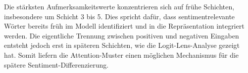Die stärksten Aufmerksamkeitswerte konzentrieren sich auf frühe Schichten, insbesondere um Schicht 3 bis 5. Dies spricht dafür, dass sentimentrelevante Wörter bereits früh im Modell identifiziert und in die Repräsentation integriert werden. Die eigentliche Trennung zwischen positiven und negativen Eingaben entsteht jedoch erst in späteren Schichten, wie die Logit-Lens-Analyse gezeigt hat. Somit liefern die Attention-Muster einen möglichen Mechanismus für die spätere Sentiment-Differenzierung.